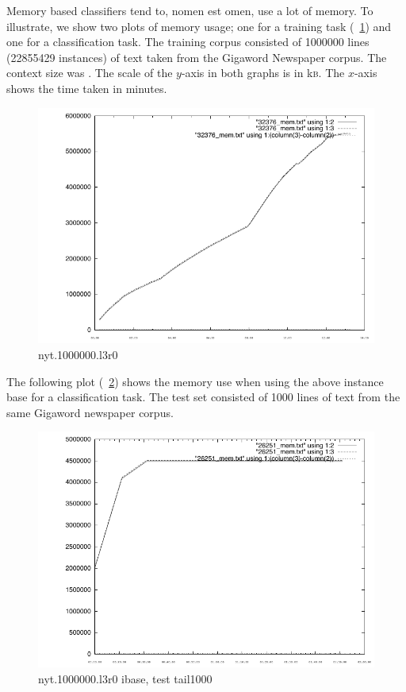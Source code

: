 \documentclass[a4paper,10pt,twoside]{report}
\begin{document}
Memory based classifiers tend to, nomen est omen, use a lot of
memory. To illustrate, we show two plots of memory usage; one for a
training task (\figurename~\ref{fig:32376_mem.pdf}) and one for a
classification task. The training corpus consisted of \num{1000000}
lines (\num{22855429} instances) of text taken from the Gigaword
Newspaper corpus. The context size was . The scale of the
$y$-axis in both graphs is in k\textsc{b}. The $x$-axis shows the time
taken in minutes.

\begin{figure}[!ht]
  \centering
  \includegraphics[width=\pdfwidth]{32376_mem.pdf}
 \caption{nyt.1000000.l3r0}
  \label{fig:32376_mem.pdf}
\end{figure}

The following plot (\figurename~\ref{fig:26251_mem.pdf}) shows the
memory use when using the above instance base for a classification
task. The test set consisted of \num{1000} lines of text from the same
Gigaword newspaper corpus.

\begin{figure}[!ht]
  \centering
  \includegraphics[width=\pdfwidth]{26251_mem.pdf}
 \caption{nyt.1000000.l3r0 ibase, test tail1000}
  \label{fig:26251_mem.pdf}
\end{figure}
\end{document}
